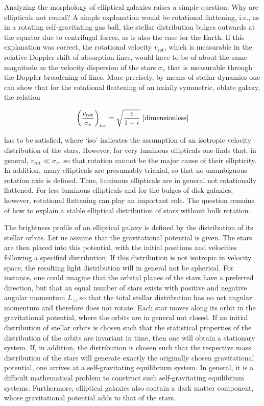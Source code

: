 \documentclass[a4paper,10pt]{article}
\begin{document}
{\noindent}Analyzing the morphology of elliptical galaxies raises a simple question: Why are ellipticals not round? A simple explanation would be rotational flattening, i.e., as in a rotating self-gravitating gas ball, the stellar distribution bulges outwards at the equator due to centrifugal forces, as is also the case for the Earth. If this explanation was correct, the rotational velocity $v_\mathrm{rot}$, which is measurable in the relative Doppler shift of absorption lines, would have to be of about the same magnitude as the velocity dispersion of the stars $\sigma_v$ that is measurable through the Doppler broadening of lines. More precisely, by means of stellar dynamics one can show that for the rotational flattening of an axially symmetric, oblate galaxy, the relation

\begin{align*}
    \left(\frac{v_\mathrm{rot}}{\sigma_v}\right)_\mathrm{iso} = \sqrt{\frac{\epsilon}{1-\epsilon}} ~ [{\rm dimensionless}]
\end{align*}

{\noindent}has to be satisfied, where `iso' indicates the assumption of an isotropic velocity distribution of the stars. However, for very luminous ellipticals one finds that, in general, $v_\mathrm{rot}\ll \sigma_v$, so that rotation cannot be the major cause of their ellipticity. In addition, many ellipticals are presumably triaxial, so that no unambiguous rotation axis is defined. Thus, luminous ellipticals are in general not rotationally flattened. For less luminous ellipticals and for the bulges of disk galaxies, however, rotational flattening can play an important role. The question remains of how to explain a stable elliptical distribution of stars without bulk rotation.

{\noindent}The brightness profile of an elliptical galaxy is defined by the distribution of its stellar orbits. Let us assume that the gravitational potential is given. The stars are then placed into this potential, with the initial positions and velocities following a specified distribution. If this distribution is not isotropic in velocity space, the resulting light distribution will in general not be spherical. For instance, one could imagine that the orbital planes of the stars have a preferred direction, but that an equal number of stars exists with positive and negative angular momentum $L_z$, so that the total stellar distribution has no net angular momentum and therefore does not rotate. Each star moves along its orbit in the gravitational potential, where the orbits are in general not closed. If an initial distribution of stellar orbits is chosen such that the statistical properties of the distribution of the orbits are invariant in time, then one will obtain a stationary system. If, in addition, the distribution is chosen such that the respective mass distribution of the stars will generate exactly the originally chosen gravitational potential, one arrives at a self-gravitating equilibrium system. In general, it is a difficult mathematical problem to construct such self-gravitating equilibrium systems. Furthermore, elliptical galaxies also contain a dark matter component, whose gravitational potential adds to that of the stars.
\end{document}
